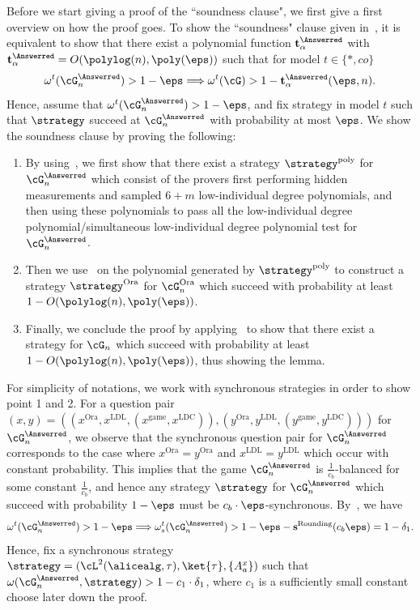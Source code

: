 Before we start giving a proof of the ``soundness clause", we first give a first overview on how the proof goes. To show the ``soundness" clause given in~, it is equivalent to show that there exist a polynomial function $\textbf{t}_{\alpha}^{\Answerred}$ with $\textbf{t}_{\alpha}^{\Answerred} = O(\polylog(n), \poly(\eps))$ such that for model $t \in \{*, co\}$
\begin{equation*}
	\omega^{t}(\cG^{\Answerred}_n) > 1 - \eps \Longrightarrow \omega^t(\cG) > 1 -\mathbf{t}^{\Answerred}_{\alpha}(\eps, n). 
\end{equation*}
Hence, assume that $\omega^{t}(\cG^{\Answerred}_n) > 1  - \eps$, and fix strategy in model $t$ such that $\strategy$ succeed at $\cG^{\Answerred}_n$ with probability at most $\eps$. We show the soundness clause by proving the following:
\begin{enumerate}
	\item By using~, we first show that there exist a strategy $\strategy^{\text{poly}}$ for $\cG^{\Answerred}_n$ which consist of the provers first performing hidden measurements and sampled $6+m$ low-individual degree polynomials, and then using these polynomials to pass all the low-individual degree polynomial/simultaneous low-individual degree polynomial test for $\cG_n^{\Answerred}$.
	\item Then we use~ on the polynomial generated by $\strategy^{\text{poly}}$ to construct a strategy $\strategy^{\text{Ora}}$ for $\cG^{\text{Ora}}_n$ which succeed with probability at least $1- O(\polylog(n), \poly(\eps))$. 
	\item Finally, we conclude the proof by applying~ to show that there exist a strategy for $\cG_n$  which succeed with probability at least $1- O(\polylog(n), \poly(\eps))$, thus showing the lemma. 
\end{enumerate}
For simplicity of notations, we work with synchronous strategies in order to show point 1 and 2. For a question pair $(x,y) = \left( (x^{\text{Ora}}, x^{\text{LDL}}, (x^{\text{game}},x^{\text{LDC}} )), (y^{\text{Ora}}, y^{\text{LDL}}, (y^{\text{game}},y^{\text{LDC}}))\right)$ for $\cG^{\Answerred}_n$, we observe that the synchronous question pair for $\cG^{\Answerred}_n$ corresponds to the case where $x^{\text{Ora}} = y^{\text{Ora}}$ and $x^{\text{LDL}} = y^{\text{LDL}}$ which occur with constant probability. This implies that the game $\cG^{\Answerred}_n$ is $\frac{1}{c_b}$-balanced for some constant $\frac{1}{c_b}$, and hence any strategy $\strategy$ for $\cG^{\Answerred}_n$ which succeed with probability $1- \eps$ must be $c_b \cdot  \eps$-synchronous. By~, we have  
\begin{equation}
	\omega^{t}(\cG^{\Answerred}_n) > 1 - \eps  \Longrightarrow	\omega^{t}_s(\cG^{\Answerred}_n) > 1 - \eps - \textbf{s}^{\text{Rounding}}(c_b\eps) = 1 - \delta_1.
\end{equation}
Hence, fix a synchronous strategy $\strategy = (\cL^2(\alicealg, \tau), \ket{\tau}, \{A_a^x \})$ such that $\omega(\cG^{\Answerred}_n, \strategy) > 1 - c_1 \cdot \delta_1$, where $c_1$ is a sufficiently small constant choose later down the proof.



